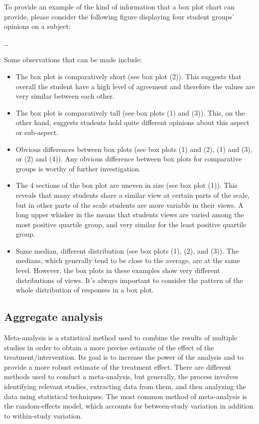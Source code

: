 \noindent To provide an example of the kind of information that a box plot chart can provide, please consider the following figure displaying four student groups' opinions on a subject:

\dots

Some observations that can be made include:
\begin{itemize}
    \item The box plot is comparatively short (see box plot  (2)). This suggests that overall the student have a high level of agreement and therefore the values are very similar between each other.
    \item The box plot is comparatively tall (see box plots (1) and (3)). This, on the other hand, suggests students hold quite different opinions about this aspect or sub-aspect.
    \item Obvious differences between box plots (see box plots (1) and (2), (1) and (3), or (2) and (4)). Any obvious difference between box plots for comparative groups is worthy of further investigation.
    \item The 4 sections of the box plot are uneven in size (see box plot (1)). This reveals that many students share a similar view at certain parts of the scale, but in other parts of the scale students are more variable in their views. A long upper whisker in the means that students views are varied among the most positive quartile group, and very similar for the least positive quartile group. 
    \item Same median, different distribution (see box plots (1), (2), and (3)). The medians, which generally tend to be close to the average, are at the same level. However, the box plots in these examples show very different distributions of views. It's always important to consider the pattern of the whole distribution of responses in a box plot.
\end{itemize}

\subsection{Aggregate analysis}
Meta-analysis is a statistical method used to combine the results of multiple studies in order to obtain a more precise estimate of the effect of the treatment/intervention. Its goal is to increase the power of the analysis and to provide a more robust estimate of the treatment effect.
There are different methods used to conduct a meta-analysis, but generally, the process involves identifying relevant studies, extracting data from them, and then analyzing the data using statistical techniques. The most common method of meta-analysis is the random-effects model, which accounts for between-study variation in addition to within-study variation.

